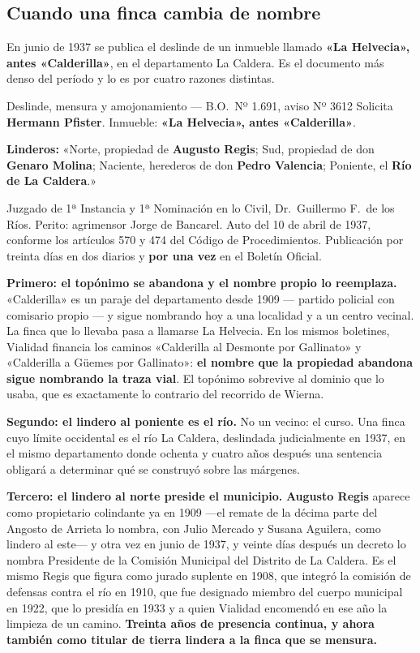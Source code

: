 \subsection*{Cuando una finca cambia de nombre}

En junio de 1937 se publica el deslinde de un inmueble llamado \textbf{«La Helvecia», antes
«Calderilla»}, en el departamento La Caldera. Es el documento más denso del período y lo es
por cuatro razones distintas.

\begin{ficha}{Deslinde, mensura y amojonamiento --- B.O.\ Nº 1.691, aviso Nº 3612}
Solicita \textbf{Hermann Pfister}. Inmueble: \textbf{«La Helvecia», antes «Calderilla»}.

\textbf{Linderos:} «Norte, propiedad de \textbf{Augusto Regis}; Sud, propiedad de don
\textbf{Genaro Molina}; Naciente, herederos de don \textbf{Pedro Valencia}; Poniente, el
\textbf{Río de La Caldera}.»

Juzgado de 1ª Instancia y 1ª Nominación en lo Civil, Dr.\ Guillermo F.\ de los Ríos. Perito:
agrimensor Jorge de Bancarel. Auto del 10 de abril de 1937, conforme los artículos 570 y 474
del Código de Procedimientos. Publicación por treinta días en dos diarios y \textbf{por una
vez} en el Boletín Oficial.
\end{ficha}

\textbf{Primero: el topónimo se abandona y el nombre propio lo reemplaza.} «Calderilla» es un
paraje del departamento desde 1909 --- partido policial con comisario propio --- y sigue
nombrando hoy a una localidad y a un centro vecinal. La finca que lo llevaba pasa a llamarse
La Helvecia. En los mismos boletines, Vialidad financia los caminos «Calderilla al Desmonte
por Gallinato» y «Calderilla a Güemes por Gallinato»: \textbf{el nombre que la propiedad
abandona sigue nombrando la traza vial}. El topónimo sobrevive al dominio que lo usaba, que
es exactamente lo contrario del recorrido de Wierna.

\textbf{Segundo: el lindero al poniente es el río.} No un vecino: el curso. Una finca cuyo
límite occidental es el río La Caldera, deslindada judicialmente en 1937, en el mismo
departamento donde ochenta y cuatro años después una sentencia obligará a determinar qué se
construyó sobre las márgenes.

\textbf{Tercero: el lindero al norte preside el municipio.} \textbf{Augusto Regis} aparece
como propietario colindante ya en 1909 ---el remate de la décima parte del Angosto de Arrieta
lo nombra, con Julio Mercado y Susana Aguilera, como lindero al este--- y otra vez en junio de 1937, y veinte días después un decreto lo nombra
Presidente de la Comisión Municipal del Distrito de La Caldera. Es el mismo Regis que figura
como jurado suplente en 1908, que integró la comisión de defensas contra el río en 1910, que
fue designado miembro del cuerpo municipal en 1922, que lo presidía en 1933 y a quien
Vialidad encomendó en ese año la limpieza de un camino. \textbf{Treinta años de presencia
continua, y ahora también como titular de tierra lindera a la finca que se mensura.}

